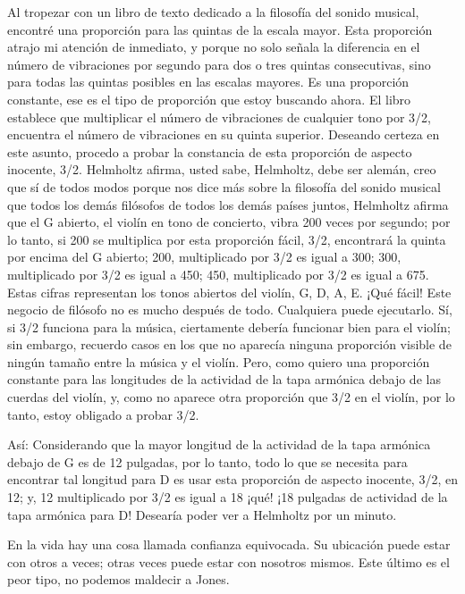 \documentclass[12pt]{book}
\begin{document}
Al tropezar con un libro de texto dedicado a la filosofía del sonido musical, encontré una proporción para las quintas de la escala mayor. Esta proporción atrajo mi atención de inmediato, y porque no solo señala la diferencia en el número de vibraciones por segundo para dos o tres quintas consecutivas, sino para todas las quintas posibles en las escalas mayores. Es una proporción constante, ese es el tipo de proporción que estoy buscando ahora. El libro establece que multiplicar el número de vibraciones de cualquier tono por 3/2, encuentra el número de vibraciones en su quinta superior. Deseando certeza en este asunto, procedo a probar la constancia de esta proporción de aspecto inocente, 3/2. Helmholtz afirma, usted sabe, Helmholtz, debe ser alemán, creo que sí de todos modos porque nos dice más sobre la filosofía del sonido musical que todos los demás filósofos de todos los demás países juntos, Helmholtz afirma que el G abierto, el violín en tono de concierto, vibra 200 veces por segundo; por lo tanto, si 200 se multiplica por esta proporción fácil, 3/2, encontrará la quinta por encima del G abierto; 200, multiplicado por 3/2 es igual a 300; 300, multiplicado por 3/2 es igual a 450; 450, multiplicado por 3/2 es igual a 675. Estas cifras representan los tonos abiertos del violín, G, D, A, E. ¡Qué fácil! Este negocio de filósofo no es mucho después de todo. Cualquiera puede ejecutarlo. Sí, si 3/2 funciona para la música, ciertamente debería funcionar bien para el violín; sin embargo, recuerdo casos en los que no aparecía ninguna proporción visible de ningún tamaño entre la música y el violín. Pero, como quiero una proporción constante para las longitudes de la actividad de la tapa armónica debajo de las cuerdas del violín, y, como no aparece otra proporción que 3/2 en el violín, por lo tanto, estoy obligado a probar 3/2.

Así: Considerando que la mayor longitud de la actividad de la tapa armónica debajo de G es de 12 pulgadas, por lo tanto, todo lo que se necesita para encontrar tal longitud para D es usar esta proporción de aspecto inocente, 3/2, en 12; y, 12 multiplicado por 3/2 es igual a 18 ¡qué! ¡18 pulgadas de actividad de la tapa armónica para D! Desearía poder ver a Helmholtz por un minuto.

En la vida hay una cosa llamada confianza equivocada. Su ubicación puede estar con otros a veces; otras veces puede estar con nosotros mismos. Este último es el peor tipo, no podemos maldecir a Jones.
\end{document}

